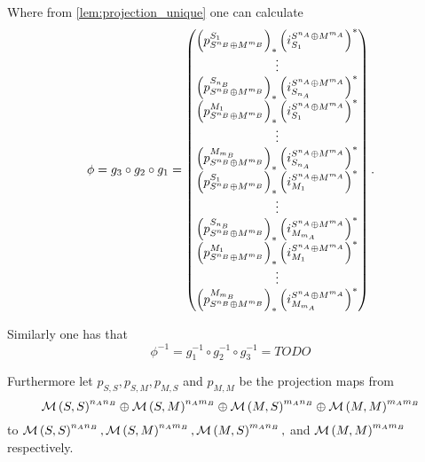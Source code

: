 \begin{remark}
    Where from \autoref{lem:projection_unique} one can calculate
    \[
        \phi = g_3 \circ g_2 \circ g_1 =
        \begin{pmatrix} %
            \tuple{ p_{S^{n_B} \oplus M^{m_B}}^{S_1} }_* \tuple{ i_{S_1}^{S^{n_A} \oplus M^{m_A}} }^* \\
            \vdots \\
            \tuple{ p_{S^{n_B} \oplus M^{m_B}}^{S_{n_B}} }_* \tuple{ i_{S_{n_A}}^{S^{n_A} \oplus M^{m_A}} }^* \\
            \tuple{ p_{S^{n_B} \oplus M^{m_B}}^{M_1} }_* \tuple{ i_{S_1}^{S^{n_A} \oplus M^{m_A}} }^* \\
            \vdots \\
            \tuple{ p_{S^{n_B} \oplus M^{m_B}}^{M_{m_B}} }_* \tuple{ i_{S_{n_A}}^{S^{n_A} \oplus M^{m_A}} }^* \\
            \tuple{ p_{S^{n_B} \oplus M^{m_B}}^{S_1} }_* \tuple{ i_{M_1}^{S^{n_A} \oplus M^{m_A}} }^* \\
            \vdots \\
            \tuple{ p_{S^{n_B} \oplus M^{m_B}}^{S_{n_B}} }_* \tuple{ i_{M_{m_A}}^{S^{n_A} \oplus M^{m_A}} }^* \\
            \tuple{ p_{S^{n_B} \oplus M^{m_B}}^{M_1} }_* \tuple{ i_{M_1}^{S^{n_A} \oplus M^{m_A}} }^* \\
            \vdots \\
            \tuple{ p_{S^{n_B} \oplus M^{m_B}}^{M_{m_B}} }_* \tuple{ i_{M_{m_A}}^{S^{n_A} \oplus M^{m_A}} }^* \\
        \end{pmatrix}.
    \]

    Similarly one has that
    \[
        \phi^{-1} = g_1^{-1} \circ g_2^{-1} \circ g_3^{-1} = TODO
    \]

    Furthermore let \( p_{S, S}, p_{S, M}, p_{M, S} \) and \( p_{M, M} \) be the projection maps from
    \[
        {\mathcal{M}}\left( S, S \right)^{n_A n_B} \oplus {\mathcal{M}}\left( S, M \right)^{n_A m_B} \oplus {\mathcal{M}}\left( M, S \right)^{m_A n_B} \oplus {\mathcal{M}}\left( M, M \right)^{m_A m_B}
    \]
    to \( {\mathcal{M}}\left( S, S \right)^{n_A n_B}, {\mathcal{M}}\left( S, M \right)^{n_A m_B}, {\mathcal{M}}\left( M, S \right)^{m_A n_B}, \) and \( {\mathcal{M}}\left( M, M \right)^{m_A m_B}  \) respectively.
\end{remark}


